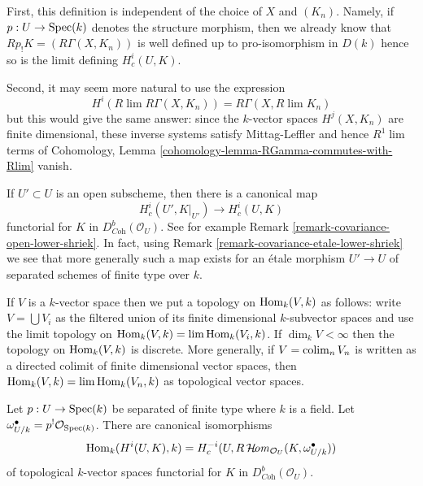 \medskip\noindent
First, this definition is independent of the choice of $X$ and $(K_n)$.
Namely, if $p : U \to \mathop{\mathrm{Spec}}(k)$ denotes the structure morphism, then
we already know that $Rp_!K = (R\Gamma(X, K_n))$
is well defined up to pro-isomorphism in $D(k)$ hence so is the limit
defining $H^i_c(U, K)$.

\medskip\noindent
Second, it may seem more natural to use the expression
$$
H^i(R\lim R\Gamma(X, K_n)) = R\Gamma(X, R\lim K_n)
$$
but this would give the same answer: since the $k$-vector spaces
$H^j(X, K_n)$ are finite dimensional, these inverse systems satisfy
Mittag-Leffler and hence $R^1\lim$ terms of Cohomology, Lemma
\ref{cohomology-lemma-RGamma-commutes-with-Rlim} vanish.

\medskip\noindent
If $U' \subset U$ is an open subscheme, then there is a canonical map
$$
H^i_c(U', K|_{U'}) \longrightarrow H^i_c(U, K)
$$
functorial for $K$ in $D^b_{\textit{Coh}}(\mathcal{O}_U)$.
See for example Remark \ref{remark-covariance-open-lower-shriek}.
In fact, using Remark \ref{remark-covariance-etale-lower-shriek}
we see that more generally such a map exists for an \'etale morphism
$U' \to U$ of separated schemes of finite type over $k$.

\medskip\noindent
If $V$ is a $k$-vector space then we put a topology on $\mathop{\mathrm{Hom}}\nolimits_k(V, k)$
as follows: write $V = \bigcup V_i$ as the filtered union of its finite
dimensional $k$-subvector spaces and use the limit topology on
$\mathop{\mathrm{Hom}}\nolimits_k(V, k) = \mathop{\mathrm{lim}}\nolimits \mathop{\mathrm{Hom}}\nolimits_k(V_i, k)$. If $\dim_k V < \infty$ then
the topology on $\mathop{\mathrm{Hom}}\nolimits_k(V, k)$ is discrete. More generally, if
$V = \mathop{\mathrm{colim}}\nolimits_n V_n$ is written as a directed colimit of finite dimensional
vector spaces, then $\mathop{\mathrm{Hom}}\nolimits_k(V, k) = \mathop{\mathrm{lim}}\nolimits \mathop{\mathrm{Hom}}\nolimits_k(V_n, k)$ as topological
vector spaces.

\begin{lemma}
\label{lemma-duality-compact-support}
Let $p : U \to \mathop{\mathrm{Spec}}(k)$ be separated of finite type where $k$ is a field.
Let $\omega_{U/k}^\bullet = p^!\mathcal{O}_{\mathop{\mathrm{Spec}}(k)}$.
There are canonical isomorphisms
$$
\mathop{\mathrm{Hom}}\nolimits_k(H^i(U, K), k) =
H^{-i}_c(U, R\mathop{\mathcal{H}\!\mathit{om}}\nolimits_{\mathcal{O}_U}(K, \omega_{U/k}^\bullet))
$$
of topological $k$-vector spaces
functorial for $K$ in $D^b_{\textit{Coh}}(\mathcal{O}_U)$.
\end{lemma}

